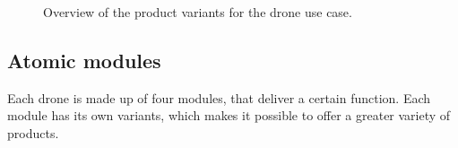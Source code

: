 \documentclass[sigconf,review]{acmart}
\begin{document}
\begin{figure}[htbp]
    \hfill
    \hfill
    \caption{Overview of the product variants for the drone use case.}
    \label{fig:product-variants}
\end{figure}

\subsection{Atomic modules}
\label{sec:atomic-modules}

Each drone is made up of four modules, that deliver a certain function. 
Each module has its own variants, which makes it possible to offer a greater variety of products. 
\end{document}
